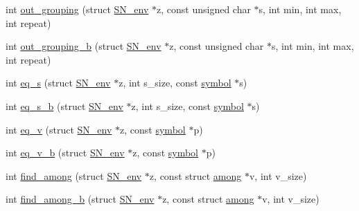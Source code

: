 \begin{DoxyCompactItemize}
\item 
int \mbox{\hyperlink{namespaceirk_1_1porter2_a70b52fa696ae35a41539b22060442b55}{out\+\_\+grouping}} (struct \mbox{\hyperlink{structirk_1_1porter2_1_1SN__env}{S\+N\+\_\+env}} $\ast$z, const unsigned char $\ast$s, int min, int max, int repeat)
\item 
int \mbox{\hyperlink{namespaceirk_1_1porter2_aac3ad9267527a7657713a0d4e11a7231}{out\+\_\+grouping\+\_\+b}} (struct \mbox{\hyperlink{structirk_1_1porter2_1_1SN__env}{S\+N\+\_\+env}} $\ast$z, const unsigned char $\ast$s, int min, int max, int repeat)
\item 
int \mbox{\hyperlink{namespaceirk_1_1porter2_afcb08be63530cb34cab448be85fa40c3}{eq\+\_\+s}} (struct \mbox{\hyperlink{structirk_1_1porter2_1_1SN__env}{S\+N\+\_\+env}} $\ast$z, int s\+\_\+size, const \mbox{\hyperlink{namespaceirk_1_1porter2_afd04c4eb58a1dabcf8f3ab2d7e9f9ed5}{symbol}} $\ast$s)
\item 
int \mbox{\hyperlink{namespaceirk_1_1porter2_af785e0dbce385d80c8c98442d9101aa3}{eq\+\_\+s\+\_\+b}} (struct \mbox{\hyperlink{structirk_1_1porter2_1_1SN__env}{S\+N\+\_\+env}} $\ast$z, int s\+\_\+size, const \mbox{\hyperlink{namespaceirk_1_1porter2_afd04c4eb58a1dabcf8f3ab2d7e9f9ed5}{symbol}} $\ast$s)
\item 
int \mbox{\hyperlink{namespaceirk_1_1porter2_a66a7929e8346eb94c0e50e3ec11a8daa}{eq\+\_\+v}} (struct \mbox{\hyperlink{structirk_1_1porter2_1_1SN__env}{S\+N\+\_\+env}} $\ast$z, const \mbox{\hyperlink{namespaceirk_1_1porter2_afd04c4eb58a1dabcf8f3ab2d7e9f9ed5}{symbol}} $\ast$p)
\item 
int \mbox{\hyperlink{namespaceirk_1_1porter2_ab1698c56d91dcf634517fabe22677bca}{eq\+\_\+v\+\_\+b}} (struct \mbox{\hyperlink{structirk_1_1porter2_1_1SN__env}{S\+N\+\_\+env}} $\ast$z, const \mbox{\hyperlink{namespaceirk_1_1porter2_afd04c4eb58a1dabcf8f3ab2d7e9f9ed5}{symbol}} $\ast$p)
\item 
int \mbox{\hyperlink{namespaceirk_1_1porter2_a19066b3162016d678bc55492a893890c}{find\+\_\+among}} (struct \mbox{\hyperlink{structirk_1_1porter2_1_1SN__env}{S\+N\+\_\+env}} $\ast$z, const struct \mbox{\hyperlink{structirk_1_1porter2_1_1among}{among}} $\ast$v, int v\+\_\+size)
\item 
int \mbox{\hyperlink{namespaceirk_1_1porter2_ac4a1844fb3b50a716566e4107a4853da}{find\+\_\+among\+\_\+b}} (struct \mbox{\hyperlink{structirk_1_1porter2_1_1SN__env}{S\+N\+\_\+env}} $\ast$z, const struct \mbox{\hyperlink{structirk_1_1porter2_1_1among}{among}} $\ast$v, int v\+\_\+size)
\item 

\end{DoxyCompactItemize}
